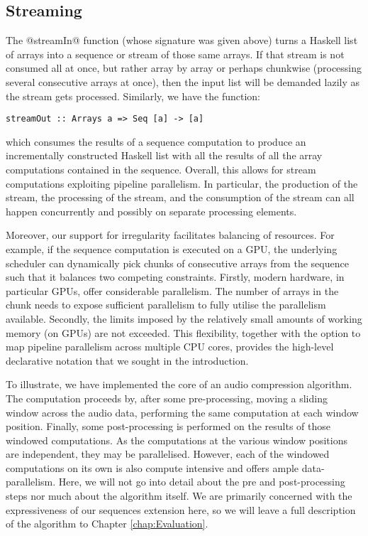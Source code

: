 \subsection{Streaming}
\label{sec:streaming}

The @streamIn@ function (whose signature was given above) turns a Haskell list of arrays into a sequence or stream of those same arrays. If that stream is not consumed all at once, but rather array by array or perhaps chunkwise (processing several consecutive arrays at once), then the input list will be demanded lazily as the stream gets processed. Similarly, we have the function:
%
\begin{lstlisting}
streamOut :: Arrays a => Seq [a] -> [a]
\end{lstlisting}
%
which consumes the results of a sequence computation to produce an incrementally constructed Haskell list with all the results of all the array computations contained in the sequence. Overall, this allows for stream computations exploiting pipeline parallelism. In particular, the production of the stream, the processing of the stream, and the consumption of the stream can all happen concurrently and possibly on separate processing elements.

Moreover, our support for irregularity facilitates balancing of resources. For example, if the sequence computation is executed on a GPU, the underlying scheduler can dynamically pick chunks of consecutive arrays from the sequence such that it balances two competing constraints. Firstly, modern hardware, in particular GPUs, offer considerable parallelism. The number of arrays in the chunk needs to expose sufficient parallelism to fully utilise the parallelism available. Secondly, the limits imposed by the relatively small amounts of working memory (on GPUs) are not exceeded. This flexibility, together with the option to map pipeline parallelism across multiple CPU cores, provides the high-level declarative notation that we sought in the introduction.

To illustrate, we have implemented the core of an audio compression algorithm. The computation proceeds by, after some pre-processing, moving a sliding window across the audio data, performing the same computation at each window position. Finally, some post-processing is performed on the results of those windowed computations. As the computations at the various window positions are independent, they may be parallelised. However, each of the windowed computations on its own is also compute intensive and offers ample data-parallelism. Here, we will not go into detail about the pre and post-processing steps nor much about the algorithm itself. We are primarily concerned with the expressiveness of our sequences extension here, so we will leave a full description of the algorithm to Chapter \ref{chap:Evaluation}.

